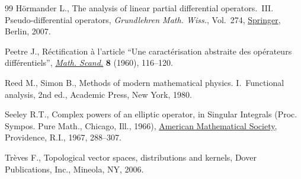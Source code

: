 \documentclass[11pt]{article}
\numberwithin{equation}{section}
\numberwithin{equation}{section}
\begin{document}
\begin{thebibliography}{99}
H\"ormander L., The analysis of linear partial differential operators.~{III}.
 Pseudo-differential operators, \textit{Grundlehren Math. Wiss.}, Vol.~274,
 \href{https://doi.org/10.1007/978-3-540-49938-1}{Springer}, Berlin, 2007.

Peetre J., R\'ectification \`a l'article ``{U}ne caract\'erisation abstraite
 des op\'erateurs diff\'erentiels'', \href{https://doi.org/10.7146/math.scand.a-10598}{\textit{Math. Scand.}} \textbf{8} (1960),
 116--120.

Reed M., Simon B., Methods of modern mathematical physics. {I}.~{F}unctional
 analysis, 2nd ed., Academic Press, New York, 1980.

Seeley R.T., Complex powers of an elliptic operator, in Singular {I}ntegrals
 ({P}roc. {S}ympos. {P}ure {M}ath., {C}hicago, {I}ll., 1966), \href{https://doi.org/10.1090/pspum/010/0237943}{American Mathematical Society}, Providence, R.I., 1967, 288--307.

Tr\`eves F., Topological vector spaces, distributions and kernels, Dover
 Publications, Inc., Mineola, NY, 2006.

\end{thebibliography}
\end{document}
